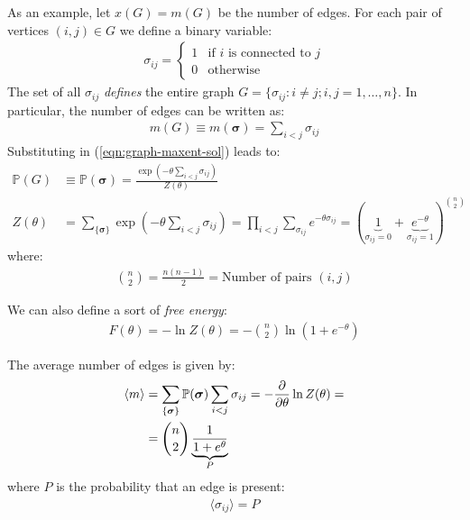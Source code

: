 \documentclass[../../main.tex]{subfiles}
\begin{document}
\begin{exo}
    As an example, let $x(G) = m(G)$ be the number of edges. For each pair of vertices $(i,j) \in G$ we define a binary variable:
    \begin{align*}
        \sigma_{ij} = \begin{cases}
            1 & \text{if $i$ is connected to $j$}\\
            0 & \text{otherwise}
        \end{cases}
    \end{align*} 
    The set of all $\sigma_{ij}$ \textit{defines} the entire graph $G = \{\sigma_{ij} \colon i \neq j; i, j = 1,\dots, n\}$. In particular, the number of edges can be written as:
    \begin{align*}
        m(G) \equiv m(\bm{\sigma}) = \sum_{i < j} \sigma_{ij}
    \end{align*}
    Substituting in (\ref{eqn:graph-maxent-sol}) leads to:
    \begin{align*}
        \mathbb{P}(G) &\equiv \mathbb{P}(\bm{\sigma}) = \frac{\exp\left(-\theta \sum_{i < j} \sigma_{ij}\right)}{Z(\theta)} \\
        Z(\theta) &=  \sum_{\{\bm{\sigma}\}} \exp\left(-\theta \sum_{i<j} \sigma_{ij}\right) =\prod_{i < j} \sum_{\sigma_{ij}} e^{-\theta \sigma_{ij}} = (\underbrace{1}_{\sigma_{ij} = 0}  + \underbrace{e^{-\theta}}_{\sigma_{ij} = 1} )^{{n \choose 2}}
    \end{align*}
    where:
    \begin{align*}
        {n\choose 2} = \frac{n(n-1)}{2} = \text{Number of pairs $(i,j)$}
    \end{align*}

    We can also define a sort of \textit{free energy}:
    \begin{align*}
        F(\theta) = -\ln Z(\theta) = -{n\choose 2} \ln(1 + e^{-\theta})
    \end{align*} 

    The average number of edges is given by:
    \begin{align*}
        \langle m \rangle &= \sum_{\{\bm{\sigma}\}} \mathbb{P}(\bm{\sigma}) \sum_{i < j} \sigma_{ij} = - \pdv{\theta} \ln Z(\theta) =\\
        &= {n \choose 2} \underbrace{\frac{1}{1 + e^{\theta}}}_{P}  
    \end{align*}
    where $P$ is the probability that an edge is present:
    \begin{align*}
        \langle \sigma_{ij} \rangle = P
    \end{align*}


\end{exo}
\end{document}
